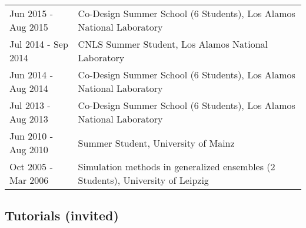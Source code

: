 \documentclass{article}
\begin{document}
\begin{tabular}{p{}p{}}
Jun 2015 - Aug 2015 & Co-Design Summer School (6 Students), Los Alamos National Laboratory \\
Jul 2014 - Sep 2014 & CNLS Summer Student, Los Alamos National Laboratory \\
Jun 2014 - Aug 2014 & Co-Design Summer School (6 Students), Los Alamos National Laboratory \\
Jul 2013 - Aug 2013 & Co-Design Summer School (6 Students), Los Alamos National Laboratory \\
Jun 2010 - Aug 2010 & Summer Student, University of Mainz \\
Oct 2005 - Mar 2006 & Simulation methods in generalized ensembles (2 Students), University of Leipzig \\
\end{tabular}

\subsection*{Tutorials (invited)}
\end{document}
